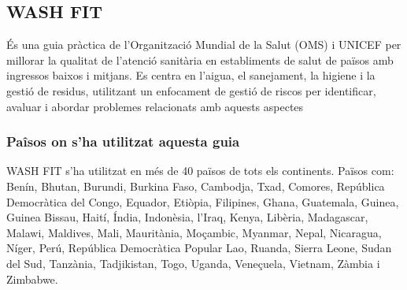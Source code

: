 \subsection{WASH FIT}
És una guia pràctica de l’Organització Mundial de la Salut (OMS) i UNICEF per millorar la qualitat de l’atenció sanitària en establiments de salut de països amb ingressos baixos i mitjans. Es centra en l’aigua, el sanejament, la higiene i la gestió de residus, utilitzant un enfocament de gestió de riscos per identificar, avaluar i abordar problemes relacionats amb aquests aspectes

\subsubsection{Paîsos on s'ha utilitzat aquesta guia}
WASH FIT s’ha utilitzat en més de 40 països de tots els continents. Països com: \\
Benín, Bhutan, Burundi, Burkina Faso, Cambodja, Txad, Comores, República Democràtica del Congo, Equador, Etiòpia, Filipines, Ghana, Guatemala, Guinea, Guinea Bissau, Haití, Índia, Indonèsia, l’Iraq, Kenya, Libèria, Madagascar, Malawi, Maldives, Mali, Mauritània, Moçambic, Myanmar, Nepal, Nicaragua, Níger, Perú, República Democràtica Popular Lao, Ruanda, Sierra Leone, Sudan del Sud, Tanzània, Tadjikistan, Togo, Uganda, Veneçuela, Vietnam, Zàmbia i Zimbabwe.
